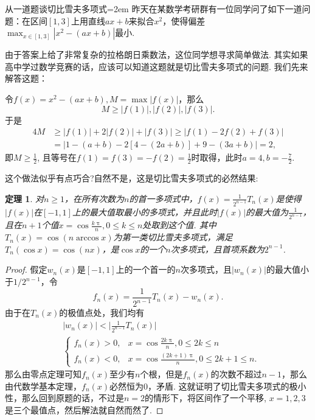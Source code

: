 \documentclass[UTF8,no-math,12pt,openany,table,dvipsnames,svgnames]{book}
\renewcommand{\pi}{\uppi}
\newcommand{\hei}{\CJKfamily{hei}}
\newenvironment{solve}{\par\indent{\hei 解}\hspace{1em}}{\par}
\newtheorem{theorem}{定理}
\renewcommand{\le}{\leqslant}
\renewcommand{\ge}{\geqslant}
\begin{document}
\begin{MYBOX}[colbacktitle=blue]{从一道题谈切比雪夫多项式}\parindent=2em
  昨天在某数学考研群有一位同学问了如下一道问题：在区间$[1,3]$上用直线$ax+b$来拟合$x^2$，使得偏差$\max_{x\in[1,3]}|x^2-(ax+b)|$最小.

  由于答案上给了非常复杂的拉格朗日乘数法，这位同学想寻求简单做法. 其实如果高中学过数学竞赛的话，应该可以知道这题就是切比雪夫多项式的问题. 我们先来解答这题：
  \begin{solve}
    令$f(x)=x^2-(ax+b),M=\max|f(x)|$，那么
    \[M\ge |f(1)|,|f(2)|,|f(3)|.\]
    于是
    \begin{align*}
      4M & \ge |f(1)| + 2|f(2)| + |f(3)| \ge |f(1)-2f(2)+f(3)|\\
      & = |1-(a+b)-2[4-(2a+b)]+9-(3a+b)|=2,
    \end{align*}
    即$M\ge \frac12$, 且等号在$f(1)=f(3)=-f(2)=\frac12$时取得，此时$a=4,b=-\frac72$.
  \end{solve}

  这个做法似乎有点巧合?自然不是，这是切比雪夫多项式的必然结果:
  \begin{theorem}
    对$n\ge1$，在所有次数为$n$的首一多项式中，$f(x)=\frac1{2^{n-1}}T_n(x)$是使得$|f(x)|$在$[-1,1]$上的最大值取最小的多项式，并且此时$|f(x)|$的最大值为$\frac1{2^{n-1}}$，且在$n+1$个值$x=\cos\frac{k\pi}n,0\le k\le n$处取到这个值. 其中$T_n(x)=\cos(n\arccos x)$为第一类切比雪夫多项式，满足$T_n(\cos x)=\cos(nx)$，是$\cos x$的一个$n$次多项式，且首项系数为$2^{n-1}$.
  \end{theorem}
  \begin{proof}
    假定$w_n(x)$是$[-1,1]$上的一个首一的$n$次多项式，且$|w_n(x)|$的最大值小于$1/2^{n-1}$，令
    \[ f_n(x)=\frac1{2^{n-1}}T_n(x) - w_n(x). \]
    由于在$T_n(x)$的极值点处，我们均有
    \begin{align*}
      & |w_n(x)| <\bigg| \frac1{2^{n-1}}T_n(x) \bigg|\\
      & \begin{cases}
         f_n(x) > 0, & x=\cos\frac{2k\pi}n, 0\le 2k\le n\\
         f_n(x)<0, & x=\cos\frac{(2k+1)\pi}n, 0
        \le 2k+1\le n.
      \end{cases}
    \end{align*}
    那么由零点定理可知$f_n(x)$至少有$n$个根，但是$f_n(x)$的次数不超过$n-1$，那么由代数学基本定理，$f_n(x)$必然恒为0，矛盾. 这就证明了切比雪夫多项式的极小性，那么回到原题的话，不过是$n=2$的情形下，将区间作了一个平移, $x=1,2,3$是三个最值点，然后解法就自然而然了.
  \end{proof}
\tcbline

\end{MYBOX}
\end{document}
